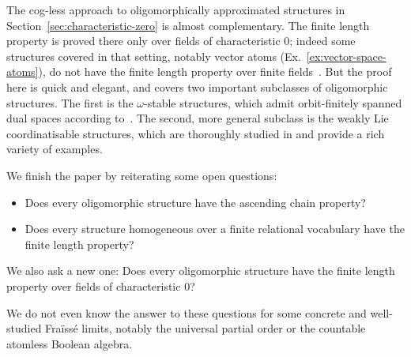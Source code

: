 The cog-less approach to oligomorphically approximated structures in Section~\ref{sec:characteristic-zero} is almost complementary.
The finite length property is proved there only over fields of characteristic $0$; indeed some structures covered in that setting, notably vector atoms (Ex.~\ref{ex:vector-space-atoms}), do not have the finite length property over finite fields~\cite[Sec.~4.4]{BFKM24}.
But the proof here is quick and elegant, and covers two important subclasses of oligomorphic structures. 
The first is the $\omega$-stable structures, which admit orbit-finitely spanned dual spaces according to~\cite[Thm.~3.7]{Przybylek_2024}.
The second, more general subclass is the weakly Lie coordinatisable structures, which are thoroughly studied in \cite{CherlinHrushovski_03} and provide a rich variety of examples.

We finish the paper by reiterating some open questions:
\begin{itemize}
\item \cite[Q.~2]{CaminaEvans_91} Does every oligomorphic structure have the ascending chain property? 
\item \cite[Q.~1.4]{Evans_pm1} Does every structure homogeneous over a finite relational vocabulary have the finite length property?
\end{itemize}

We also  ask a new one: Does every oligomorphic structure have the finite length property over fields of characteristic $0$?

We do not even know the answer to these questions for some concrete and well-studied Fraïssé limits, notably the universal partial order or the countable atomless Boolean algebra.
